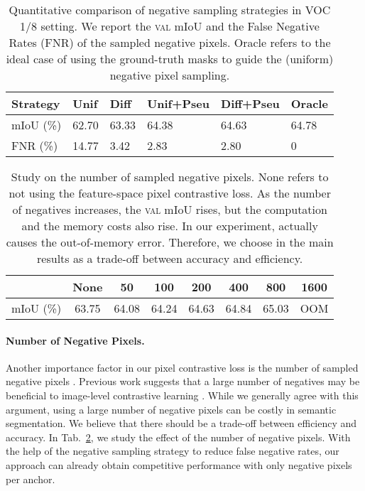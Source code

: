 \begin{table}[tb]
    \small
    \centering
    \caption{Quantitative comparison of negative sampling strategies in VOC 1/8 setting. We report the \textsc{val} mIoU and the False Negative Rates (FNR) of the sampled negative pixels. Oracle refers to the ideal case of using the ground-truth masks to guide the (uniform) negative pixel sampling.}
    \label{tab:abl/sample}
    \vspace{-5pt}
    \setlength{\tabcolsep}{5pt}
    \begin{tabular}{l|llll|l}
    \toprule
        Strategy  & Unif & Diff & Unif+Pseu & Diff+Pseu & Oracle  \\
    \midrule
        mIoU (\%)  & 62.70  & 63.33  & 64.38  & 64.63  & 64.78  \\
        FNR (\%)   & 14.77  & \phantom{0}3.42  & \phantom{0}2.83   & \phantom{0}2.80   & \phantom{0}0 \\
    \bottomrule
    \end{tabular}
    \vspace{-5pt}
\end{table}

\begin{table}[tb]
    \small
    \centering
    \caption{Study on the number of sampled negative pixels. None refers to not using the feature-space pixel contrastive loss. As the number of negatives increases, the \textsc{val} mIoU rises, but the computation and the memory costs also rise. In our experiment,  actually causes the out-of-memory error. Therefore, we choose  in the main results as a trade-off between accuracy and efficiency.}
    \label{tab:abl/numneg}
    \vspace{-5pt}
    \setlength{\tabcolsep}{3.5pt}
    \begin{tabular}{lccccccc}
    \toprule
         & None  & 50  & 100  & 200  & 400  & 800 & 1600 \\
    \midrule
    mIoU (\%)      & 63.75  & 64.08  & 64.24  & 64.63  & 64.84  &  65.03 & OOM \\
    \bottomrule
    \end{tabular}
    \vspace{-10pt}
\end{table}


\paragraph{Number of Negative Pixels.}
Another importance factor in our pixel contrastive loss is the number of sampled negative pixels . Previous work suggests that a large number of negatives may be beneficial to image-level contrastive learning \cite{chen2020simple,he2020momentum}. While we generally agree with this argument, using a large number of negative pixels can be costly in semantic segmentation. We believe that there should be a trade-off between efficiency and accuracy. In Tab.~\ref{tab:abl/numneg}, we study the effect of the number of negative pixels. With the help of the negative sampling strategy to reduce false negative rates, our approach can already obtain competitive performance with only  negative pixels per anchor.


